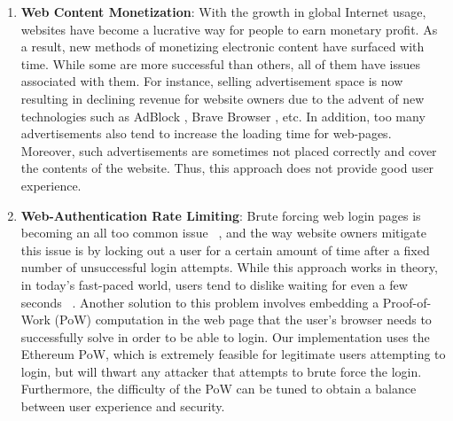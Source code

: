 \documentclass[runningheads]{llncs}
\begin{document}
\begin{enumerate}

\item \textbf{Web Content Monetization}: With the growth in global Internet usage, websites have become a lucrative way for people to earn monetary profit. As a result, new methods of monetizing electronic content have surfaced with time. While some are more successful than others, all of them have issues associated with them. For instance, selling advertisement space is now resulting in declining revenue \cite{decliningRevenue} for website owners due to the advent of new technologies such as AdBlock \cite{Adblock}, Brave Browser \cite{BraveBrowser}, etc. In addition, too many advertisements also tend to increase the loading time for web-pages. Moreover, such advertisements are sometimes not placed correctly and cover the contents of the website. Thus, this approach does not provide good user experience. 
\item \textbf{Web-Authentication Rate Limiting}: Brute forcing web login pages is becoming an all too common issue ~\cite{webLoginBruteForce}, and the way website owners mitigate this issue is by locking out a user for a certain amount of time after a fixed number of unsuccessful login attempts. While this approach works in theory, in today's fast-paced world, users tend to dislike waiting for even a few seconds ~\cite{usersDislikeWaiting}. Another solution to this problem involves embedding a Proof-of-Work (PoW) computation in the web page that the user's browser needs to successfully solve in order to be able to login. Our implementation uses the Ethereum PoW, which is extremely feasible for legitimate users attempting to login, but will thwart any attacker that attempts to brute force the login. Furthermore, the difficulty of the PoW can be tuned to obtain a balance between user experience and security. 

\end{enumerate}
\end{document}
